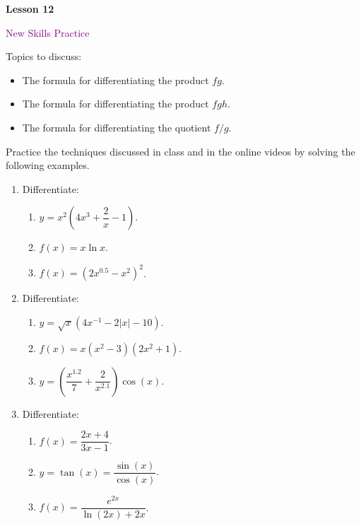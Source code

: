 \documentclass[10pt]{book}
\theoremstyle{definition}
\theoremstyle{remark}
\begin{document}
\begin{tcolorbox}[
  width=\textwidth,
  colback=gray!10, %
  colframe=white, %
  boxrule=0pt,    %
  left=1cm,       %
  right=1cm,      %
  sharp corners  %
]

\begin{minipage}[t]{0.5\textwidth}
  \Huge \textbf{Lesson 12}
\end{minipage}%
\hfill
\begin{minipage}[t]{0.5\textwidth}
  \Huge\textcolor{purple}{New Skills Practice}
\end{minipage}
\end{tcolorbox}

\begin{large}
\noindent
Topics to discuss:
\begin{itemize}
\item The formula for differentiating the product $fg$.
\item The formula for differentiating the product $fgh$.
\item The formula for differentiating the quotient $f/g$.
\end{itemize}
\newpage

\noindent
Practice the techniques discussed in class and in the online videos by solving the following examples. 
\begin{enumerate}
\item Differentiate: 
\begin{enumerate} 
\item $y =x^2\left( 4x^3 + \dfrac{2}{x} - 1\right)$.\vfil
\item $f \left(x\right) = x \ln x $.\vfil
\item $f\left(x\right) = \left(2x^{0.5} - x^2\right)^2$.\vfil
\end{enumerate}
\newpage

\item Differentiate: 
\begin{enumerate} 
\item $y = \sqrt{x}\left(4x^{-1} - 2|x| - 10\right)$.\vfil
\item $f\left(x\right) = x\left(x^2 - 3\right)\left(2x^2 + 1\right)$.\vfil
\item $y = \left(\dfrac{x^{1.2}}{7} + \dfrac{2}{x^{2.1}} \right)\cos(x)$.\vfil
\end{enumerate}
\newpage

\item Differentiate: 
\begin{enumerate} 
\item $f\left(x\right) =\dfrac{2x+4}{3x-1}$.\vfil
\item $y =\tan(x) = \dfrac{\sin(x)}{\cos(x)}$.\vfil
\item $f(x) = \dfrac{e^{2x}}{\ln(2x)+2x}$.\vfil
\end{enumerate}
\newpage


\end{enumerate}
\end{large}
\end{document}
